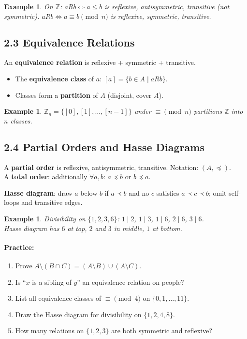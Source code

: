 \documentclass[11pt]{article}
\newtheorem{example}[definition]{Example}
\newenvironment{practice}{\paragraph*{\textbf{Practice:}}}{}
\newcommand{\Z}{\mathbb{Z}}
\newcommand{\divides}{\mid}
\begin{document}
\begin{example}
On $\Z$: $aRb\Leftrightarrow a\le b$ is reflexive, antisymmetric, transitive (not symmetric). $aRb\Leftrightarrow a\equiv b\pmod n$ is reflexive, symmetric, transitive.
\end{example}

\subsection*{2.3 Equivalence Relations}

An \textbf{equivalence relation} is reflexive + symmetric + transitive.

\begin{itemize}[nosep]
  \item The \textbf{equivalence class} of $a$: $[a]=\{b\in A\mid aRb\}$.
  \item Classes form a \textbf{partition} of $A$ (disjoint, cover $A$).
\end{itemize}

\begin{example}
$\Z_n = \{[0],[1],\ldots,[n-1]\}$ under $\equiv\pmod n$ partitions $\Z$ into $n$ classes.
\end{example}

\subsection*{2.4 Partial Orders and Hasse Diagrams}

A \textbf{partial order} is reflexive, antisymmetric, transitive. Notation: $(A,\preceq)$.\\
A \textbf{total order}: additionally $\forall a,b$: $a\preceq b$ or $b\preceq a$.

\textbf{Hasse diagram}: draw $a$ below $b$ if $a\prec b$ and no $c$ satisfies $a\prec c\prec b$; omit self-loops and transitive edges.

\begin{example}
Divisibility on $\{1,2,3,6\}$: $1\divides 2$, $1\divides 3$, $1\divides 6$, $2\divides 6$, $3\divides 6$.\\
Hasse diagram has $6$ at top, $2$ and $3$ in middle, $1$ at bottom.
\end{example}

\begin{practice}
\begin{enumerate}[nosep,label=\arabic*.]
  \item Prove $A\setminus(B\cap C)=(A\setminus B)\cup(A\setminus C)$.
  \item Is ``$x$ is a sibling of $y$'' an equivalence relation on people?
  \item List all equivalence classes of $\equiv\pmod 4$ on $\{0,1,\ldots,11\}$.
  \item Draw the Hasse diagram for divisibility on $\{1,2,4,8\}$.
  \item How many relations on $\{1,2,3\}$ are both symmetric and reflexive?
\end{enumerate}
\end{practice}
\end{document}
